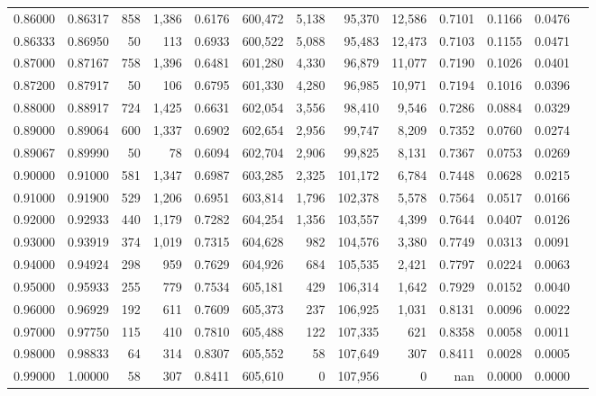 \begin{tabular}{rrrrrrrrrrrrr}
0.86000 & 0.86317 &    858 & 1,386 &                                     0.6176 & 600,472 &   5,138 &  95,370 &  12,586 & 0.7101 & 0.1166 & 0.0476 \\
0.86333 & 0.86950 &     50 &   113 &                                     0.6933 & 600,522 &   5,088 &  95,483 &  12,473 & 0.7103 & 0.1155 & 0.0471 \\
0.87000 & 0.87167 &    758 & 1,396 &                                     0.6481 & 601,280 &   4,330 &  96,879 &  11,077 & 0.7190 & 0.1026 & 0.0401 \\
0.87200 & 0.87917 &     50 &   106 &                                     0.6795 & 601,330 &   4,280 &  96,985 &  10,971 & 0.7194 & 0.1016 & 0.0396 \\
0.88000 & 0.88917 &    724 & 1,425 &                                     0.6631 & 602,054 &   3,556 &  98,410 &   9,546 & 0.7286 & 0.0884 & 0.0329 \\
0.89000 & 0.89064 &    600 & 1,337 &                                     0.6902 & 602,654 &   2,956 &  99,747 &   8,209 & 0.7352 & 0.0760 & 0.0274 \\
0.89067 & 0.89990 &     50 &    78 &                                     0.6094 & 602,704 &   2,906 &  99,825 &   8,131 & 0.7367 & 0.0753 & 0.0269 \\
0.90000 & 0.91000 &    581 & 1,347 &                                     0.6987 & 603,285 &   2,325 & 101,172 &   6,784 & 0.7448 & 0.0628 & 0.0215 \\
0.91000 & 0.91900 &    529 & 1,206 &                                     0.6951 & 603,814 &   1,796 & 102,378 &   5,578 & 0.7564 & 0.0517 & 0.0166 \\
0.92000 & 0.92933 &    440 & 1,179 &                                     0.7282 & 604,254 &   1,356 & 103,557 &   4,399 & 0.7644 & 0.0407 & 0.0126 \\
0.93000 & 0.93919 &    374 & 1,019 &                                     0.7315 & 604,628 &     982 & 104,576 &   3,380 & 0.7749 & 0.0313 & 0.0091 \\
0.94000 & 0.94924 &    298 &   959 &                                     0.7629 & 604,926 &     684 & 105,535 &   2,421 & 0.7797 & 0.0224 & 0.0063 \\
0.95000 & 0.95933 &    255 &   779 &                                     0.7534 & 605,181 &     429 & 106,314 &   1,642 & 0.7929 & 0.0152 & 0.0040 \\
0.96000 & 0.96929 &    192 &   611 &                                     0.7609 & 605,373 &     237 & 106,925 &   1,031 & 0.8131 & 0.0096 & 0.0022 \\
0.97000 & 0.97750 &    115 &   410 &                                     0.7810 & 605,488 &     122 & 107,335 &     621 & 0.8358 & 0.0058 & 0.0011 \\
0.98000 & 0.98833 &     64 &   314 &                                     0.8307 & 605,552 &      58 & 107,649 &     307 & 0.8411 & 0.0028 & 0.0005 \\
0.99000 & 1.00000 &     58 &   307 &                                     0.8411 & 605,610 &       0 & 107,956 &       0 &    nan & 0.0000 & 0.0000 \\
\bottomrule
\end{tabular}

